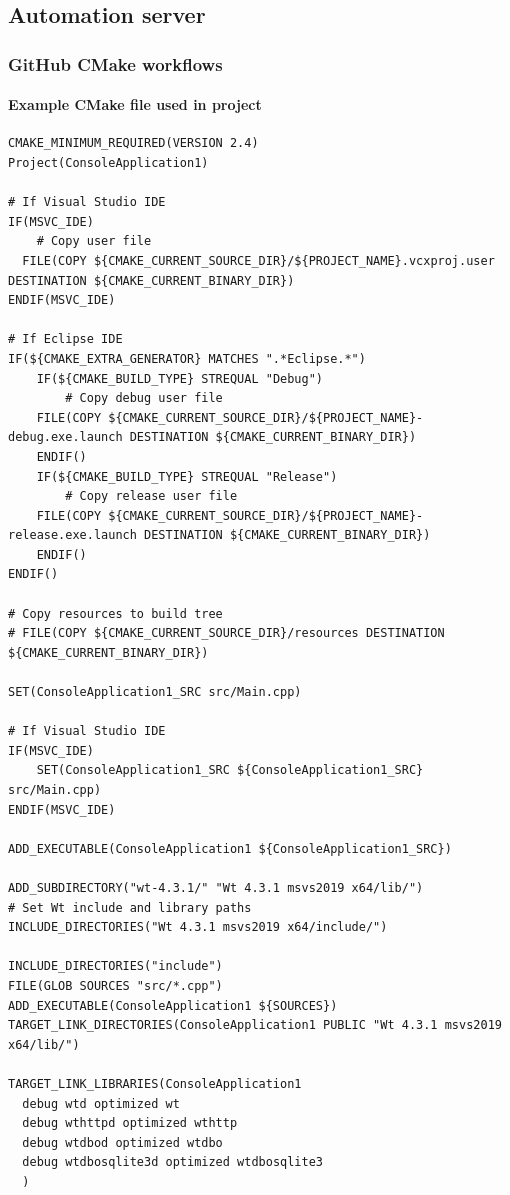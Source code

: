 \documentclass[a4paper,12pt]{article}
\begin{document}
\subsection{Automation server}
\subsubsection{GitHub CMake workflows}
\paragraph{Example CMake file used in project}
\begin{verbatim}
CMAKE_MINIMUM_REQUIRED(VERSION 2.4)
Project(ConsoleApplication1)

# If Visual Studio IDE
IF(MSVC_IDE)
	# Copy user file
  FILE(COPY ${CMAKE_CURRENT_SOURCE_DIR}/${PROJECT_NAME}.vcxproj.user DESTINATION ${CMAKE_CURRENT_BINARY_DIR})
ENDIF(MSVC_IDE)

# If Eclipse IDE
IF(${CMAKE_EXTRA_GENERATOR} MATCHES ".*Eclipse.*")
	IF(${CMAKE_BUILD_TYPE} STREQUAL "Debug")
		# Copy debug user file
    FILE(COPY ${CMAKE_CURRENT_SOURCE_DIR}/${PROJECT_NAME}-debug.exe.launch DESTINATION ${CMAKE_CURRENT_BINARY_DIR})
	ENDIF()
	IF(${CMAKE_BUILD_TYPE} STREQUAL "Release")
		# Copy release user file
    FILE(COPY ${CMAKE_CURRENT_SOURCE_DIR}/${PROJECT_NAME}-release.exe.launch DESTINATION ${CMAKE_CURRENT_BINARY_DIR})
	ENDIF()
ENDIF()

# Copy resources to build tree
# FILE(COPY ${CMAKE_CURRENT_SOURCE_DIR}/resources DESTINATION ${CMAKE_CURRENT_BINARY_DIR})

SET(ConsoleApplication1_SRC src/Main.cpp)

# If Visual Studio IDE
IF(MSVC_IDE)
	SET(ConsoleApplication1_SRC ${ConsoleApplication1_SRC} src/Main.cpp)
ENDIF(MSVC_IDE)

ADD_EXECUTABLE(ConsoleApplication1 ${ConsoleApplication1_SRC})

ADD_SUBDIRECTORY("wt-4.3.1/" "Wt 4.3.1 msvs2019 x64/lib/")
# Set Wt include and library paths
INCLUDE_DIRECTORIES("Wt 4.3.1 msvs2019 x64/include/")

INCLUDE_DIRECTORIES("include")
FILE(GLOB SOURCES "src/*.cpp")
ADD_EXECUTABLE(ConsoleApplication1 ${SOURCES})
TARGET_LINK_DIRECTORIES(ConsoleApplication1 PUBLIC "Wt 4.3.1 msvs2019 x64/lib/")

TARGET_LINK_LIBRARIES(ConsoleApplication1
  debug wtd optimized wt
  debug wthttpd optimized wthttp
  debug wtdbod optimized wtdbo
  debug wtdbosqlite3d optimized wtdbosqlite3
  )
\end{verbatim}
\end{document}
